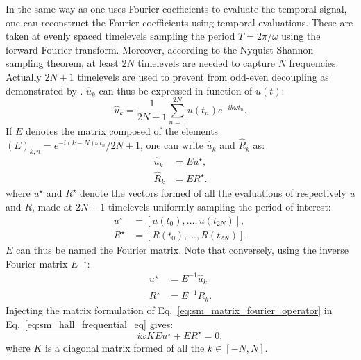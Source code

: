 In the same way as one uses Fourier coefficients to
evaluate the temporal signal,
one can reconstruct the Fourier coefficients using
temporal evaluations. These are taken at evenly spaced timelevels
sampling the period $T = 2 \pi / \omega$ using the forward
Fourier transform. Moreover, 
according to the Nyquist-Shannon~\cite{Shannon1949} sampling theorem, 
at least $2N$ timelevels are needed to capture $N$ frequencies. Actually
$2N+1$ timelevels are used to prevent from odd-even decoupling as
demonstrated by \citet{Weide2005}. $\widehat{u}_k$ can thus
be expressed in function of $u(t)$:
\begin{equation}
	\widehat{u}_k = \frac{1}{2N+1} 
	\sum_{n=0}^{2N} u(t_n) e^{-i k \omega t_n}.
\end{equation}
If $E$ denotes the matrix composed of the elements 
$(E)_{k,n} = e^{-i (k - N) \omega t_n} / 2N+1$, one can write $\widehat{u}_k$
and $\widehat{R}_k$ as:
\begin{equation}
	\begin{split}
		\widehat{u}_k &= E u^\star, \\
		\widehat{R}_k &= E R^\star.
	\end{split}
	\label{eq:sm_matrix_fourier_operator}
\end{equation}
where $u^\star$ and $R^\star$ 
denote the vectors formed of all the evaluations of respectively $u$
and $R$,
made at $2N+1$ timelevels uniformly sampling the period of interest:
\begin{equation}
	\begin{split}
		u^\star &= [u(t_0), \ldots, u(t_{2N})], \\
		R^\star &= [R(t_0), \ldots, R(t_{2N})].
	\end{split}
\end{equation}
$E$ can thus be named the Fourier matrix.
Note that conversely, using the inverse Fourier matrix $E^{-1}$:
\begin{equation}
	\begin{split}
		u^\star &= E^{-1} \widehat{u}_k \\
		R^\star &= E^{-1} \widehat{R}_k.
	\end{split}
\end{equation}
Injecting the matrix formulation of 
Eq.~\eqref{eq:sm_matrix_fourier_operator} in 
Eq.~\eqref{eq:sm_hall_frequential_eq}
gives:
\begin{equation}
	i \omega K E u^\star + E R^\star = 0,
\end{equation}
where $K$ is a diagonal matrix formed of all the $k \in [-N, N]$.
